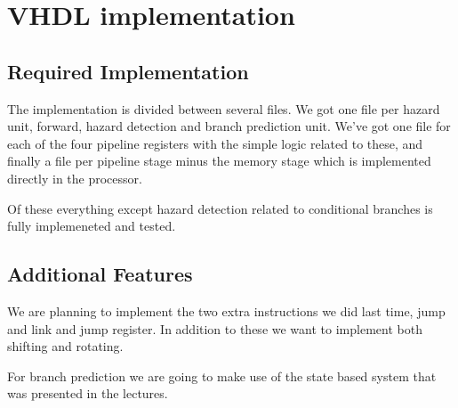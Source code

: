 \section{VHDL implementation}

\subsection{Required Implementation}
The implementation is divided between several files. We got one file per hazard
unit, forward, hazard detection and branch prediction unit. We've got one file
for each of the four pipeline registers with the simple logic related to these,
and finally a file per pipeline stage minus the memory stage which is implemented
directly in the processor. 

Of these everything except hazard detection related to conditional branches is 
fully implemeneted and tested.

\subsection{Additional Features}
We are planning to implement the two extra instructions we did last time, jump
and link and jump register. In addition to these we want to implement both
shifting and rotating.

For branch prediction we are going to make use of the state based system that 
was presented in the lectures.
